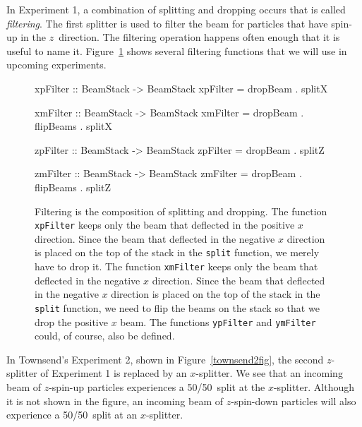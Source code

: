 \documentclass{eptcs}
\newcommand{\DataTypeTok}[1]{\textcolor[rgb]{0.56,0.13,0.00}{{#1}}}
\newcommand{\SpecialCharTok}[1]{\textcolor[rgb]{0.25,0.44,0.63}{{#1}}}
\newcommand{\FunctionTok}[1]{\textcolor[rgb]{0.02,0.16,0.49}{{#1}}}
\newcommand{\OperatorTok}[1]{\textcolor[rgb]{0.40,0.40,0.40}{{#1}}}
\begin{document}
In Experiment 1, a combination of splitting and dropping occurs
that is called \emph{filtering}.  The first splitter is used
to filter the beam for particles that have spin-up in the $z$~direction.
The filtering operation happens often enough that it is useful to name
it.  Figure~\ref{expapifilter} shows several filtering functions
that we will use in upcoming experiments.

\begin{figure}
\begin{Highlighting}[]
\FunctionTok{xpFilter} \SpecialCharTok{::} \DataTypeTok{BeamStack} \SpecialCharTok{->} \DataTypeTok{BeamStack}
\FunctionTok{xpFilter} \OperatorTok{=} \FunctionTok{dropBeam} \OperatorTok{.} \FunctionTok{splitX}

\FunctionTok{xmFilter} \SpecialCharTok{::} \DataTypeTok{BeamStack} \SpecialCharTok{->} \DataTypeTok{BeamStack}
\FunctionTok{xmFilter} \OperatorTok{=} \FunctionTok{dropBeam} \OperatorTok{.} \FunctionTok{flipBeams} \OperatorTok{.} \FunctionTok{splitX}

\FunctionTok{zpFilter} \SpecialCharTok{::} \DataTypeTok{BeamStack} \SpecialCharTok{->} \DataTypeTok{BeamStack}
\FunctionTok{zpFilter} \OperatorTok{=} \FunctionTok{dropBeam} \OperatorTok{.} \FunctionTok{splitZ}

\FunctionTok{zmFilter} \SpecialCharTok{::} \DataTypeTok{BeamStack} \SpecialCharTok{->} \DataTypeTok{BeamStack}
\FunctionTok{zmFilter} \OperatorTok{=} \FunctionTok{dropBeam} \OperatorTok{.} \FunctionTok{flipBeams} \OperatorTok{.} \FunctionTok{splitZ}
\end{Highlighting}
\caption{Filtering is the composition of splitting and dropping.
  The function \FunctionTok{\texttt{xpFilter}} keeps only the beam that deflected in the positive $x$ direction.
  Since the beam that deflected in the negative $x$ direction is placed on the top of the stack
  in the \FunctionTok{\texttt{split}} function, we merely have to drop it.
  The function \FunctionTok{\texttt{xmFilter}} keeps only the beam that deflected in the negative $x$ direction.
  Since the beam that deflected in the negative $x$ direction is placed on the top of the stack
  in the \FunctionTok{\texttt{split}} function, we need to flip the beams on the stack so that we
  drop the positive $x$ beam.
  The functions \FunctionTok{\texttt{ypFilter}} and \FunctionTok{\texttt{ymFilter}} could,
  of course, also be defined.
}
\label{expapifilter}
\end{figure}

In Townsend's Experiment 2, shown in Figure~\ref{townsend2fig},
the second $z$-splitter of Experiment 1 is replaced by an $x$-splitter.
We see that an incoming beam of $z$-spin-up particles experiences
a 50/50~split at the $x$-splitter.
Although it is not shown in the figure,
an incoming beam of $z$-spin-down particles will also experience
a 50/50~split at an $x$-splitter.
\end{document}

